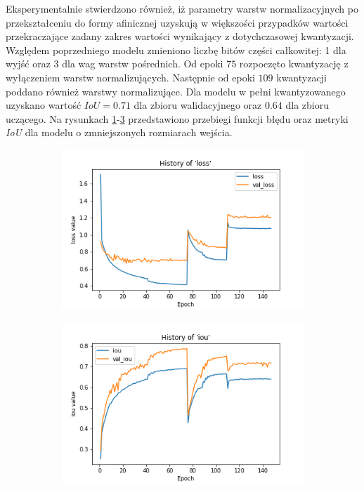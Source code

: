 Eksperymentalnie stwierdzono również, iż parametry warstw normalizacyjnych po przekształceniu do formy afinicznej uzyskują w większości przypadków wartości przekraczające zadany zakres wartości wynikający z dotychczasowej kwantyzacji.
Względem poprzedniego modelu zmieniono liczbę bitów części całkowitej: 1 dla wyjść oraz 3 dla wag warstw pośrednich.
Od epoki $75$ rozpoczęto kwantyzację z wyłączeniem warstw normalizujących.
Następnie od epoki $109$ kwantyzacji poddano również warstwy normalizujące.
Dla modelu w pełni kwantyzowanego uzyskano wartość $IoU = 0.71$ dla zbioru walidacyjnego oraz $0.64$ dla zbioru uczącego. 
Na rysunkach \ref{fig:small_loss}-\ref{fig:small_iou} przedstawiono przebiegi funkcji błędu oraz metryki \emph{IoU} dla modelu o zmniejszonych rozmiarach wejścia. 

\begin{figure}
     \centering
     \begin{subfigure}[b]{0.49\textwidth}
         \centering
         \includegraphics[width=\textwidth]{images/LN_smaller_hist_of_loss.png}
         \caption{}
         \label{fig:small_loss}
     \end{subfigure}
     \hfill
     \begin{subfigure}[b]{0.49\textwidth}
         \centering
         \includegraphics[width=\textwidth]{images/LN_smaller_hist_of_iou.png}
         \caption{}
         \label{fig:small_iou}
     \end{subfigure}
     

\end{figure}
